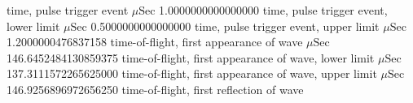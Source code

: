 \expandafter\def\csname oct2tex.air_d50_v800_P.t0.d\endcsname{time, pulse trigger event}
\expandafter\def\csname oct2tex.air_d50_v800_P.t0.u\endcsname{\ensuremath{\mu\text{Sec}}}
\expandafter\def\csname oct2tex.air_d50_v800_P.t0.v\endcsname{1.0000000000000000}
\expandafter\def\csname oct2tex.air_d50_v800_P.t0a.d\endcsname{time, pulse trigger event, lower limit}
\expandafter\def\csname oct2tex.air_d50_v800_P.t0a.u\endcsname{\ensuremath{\mu\text{Sec}}}
\expandafter\def\csname oct2tex.air_d50_v800_P.t0a.v\endcsname{0.5000000000000000}
\expandafter\def\csname oct2tex.air_d50_v800_P.t0b.d\endcsname{time, pulse trigger event, upper limit}
\expandafter\def\csname oct2tex.air_d50_v800_P.t0b.u\endcsname{\ensuremath{\mu\text{Sec}}}
\expandafter\def\csname oct2tex.air_d50_v800_P.t0b.v\endcsname{1.2000000476837158}
\expandafter\def\csname oct2tex.air_d50_v800_P.t1.d\endcsname{time-of-flight, first appearance of wave}
\expandafter\def\csname oct2tex.air_d50_v800_P.t1.u\endcsname{\ensuremath{\mu\text{Sec}}}
\expandafter\def\csname oct2tex.air_d50_v800_P.t1.v\endcsname{146.6452484130859375}
\expandafter\def\csname oct2tex.air_d50_v800_P.t1a.d\endcsname{time-of-flight, first appearance of wave, lower limit}
\expandafter\def\csname oct2tex.air_d50_v800_P.t1a.u\endcsname{\ensuremath{\mu\text{Sec}}}
\expandafter\def\csname oct2tex.air_d50_v800_P.t1a.v\endcsname{137.3111572265625000}
\expandafter\def\csname oct2tex.air_d50_v800_P.t1b.d\endcsname{time-of-flight, first appearance of wave, upper limit}
\expandafter\def\csname oct2tex.air_d50_v800_P.t1b.u\endcsname{\ensuremath{\mu\text{Sec}}}
\expandafter\def\csname oct2tex.air_d50_v800_P.t1b.v\endcsname{146.9256896972656250}
\expandafter\def\csname oct2tex.air_d50_v800_P.t2.d\endcsname{time-of-flight, first reflection of wave}
